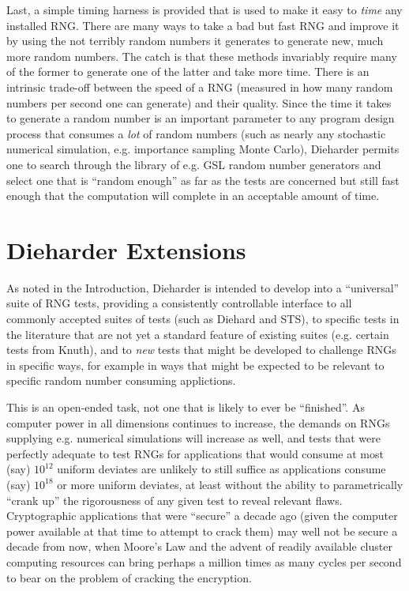 \documentclass[12pt]{article}
\begin{document}
Last, a simple timing harness is provided that is used to make it easy
to {\em time} any installed RNG.  There are many ways to take a bad but
fast RNG and improve it by using the not terribly random numbers it
generates to generate new, much more random numbers.  The catch is that
these methods invariably require many of the former to generate one of
the latter and take more time.  There is an intrinsic trade-off between
the speed of a RNG (measured in how many random numbers per second one
can generate) and their quality.  Since the time it takes to generate a
random number is an important parameter to any program design process
that consumes a {\em lot} of random numbers (such as nearly any
stochastic numerical simulation, e.g. importance sampling Monte Carlo),
Dieharder permits one to search through the library of e.g. GSL random
number generators and select one that is ``random enough'' as far as
the tests are concerned but still fast enough that the computation will
complete in an acceptable amount of time.

\section{Dieharder Extensions}

As noted in the Introduction, Dieharder is intended to develop into a
``universal'' suite of RNG tests, providing a consistently controllable
interface to all commonly accepted suites of tests (such as Diehard and
STS), to specific tests in the literature that are not yet a standard
feature of existing suites (e.g. certain tests from Knuth), and to {\em
new} tests that might be developed to challenge RNGs in specific ways,
for example in ways that might be expected to be relevant to specific
random number consuming applictions.

This is an open-ended task, not one that is likely to ever be
``finished''.  As computer power in all dimensions continues to
increase, the demands on RNGs supplying e.g. numerical simulations will
increase as well, and tests that were perfectly adequate to test RNGs
for applications that would consume at most (say) $10^{12}$ uniform
deviates are unlikely to still suffice as applications consume (say)
$10^{18}$ or more uniform deviates, at least without the ability to
parametrically ``crank up'' the rigorousness of any given test to reveal
relevant flaws.  Cryptographic applications that were ``secure'' a
decade ago (given the computer power available at that time to attempt
to crack them) may well not be secure a decade from now, when Moore's
Law and the advent of readily available cluster computing resources can
bring perhaps a million times as many cycles per second to bear on the
problem of cracking the encryption.
\end{document}

